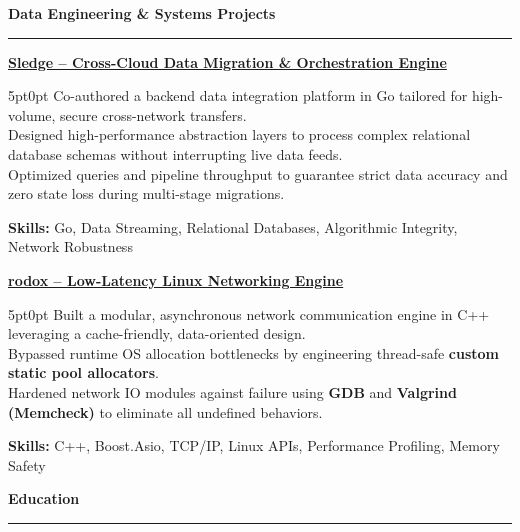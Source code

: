 \documentclass[9pt]{extarticle}
\begin{document}
\par\vspace{5pt}

{\large\bfseries Data Engineering \& Systems Projects}
\par\vspace{-8pt}
\rule{\linewidth}{0.4pt}
\par\vspace{5pt}

\underline{\bfseries Sledge -- Cross-Cloud Data Migration \& Orchestration Engine}
\par
\begin{adjustwidth}{5pt}{0pt}
    Co-authored a backend data integration platform in Go tailored for high-volume, secure cross-network transfers. \\
    Designed high-performance abstraction layers to process complex relational database schemas without interrupting live data feeds. \\
    Optimized queries and pipeline throughput to guarantee strict data accuracy and zero state loss during multi-stage migrations.
\end{adjustwidth}
\par
{\bfseries Skills:} Go, Data Streaming, Relational Databases, Algorithmic Integrity, Network Robustness

\par\vspace{8pt}

\underline{\bfseries rodox -- Low-Latency Linux Networking Engine}
\par
\begin{adjustwidth}{5pt}{0pt}
    Built a modular, asynchronous network communication engine in C++ leveraging a cache-friendly, data-oriented design. \\
    Bypassed runtime OS allocation bottlenecks by engineering thread-safe {\bfseries custom static pool allocators}. \\
    Hardened network IO modules against failure using {\bfseries GDB} and {\bfseries Valgrind (Memcheck)} to eliminate all undefined behaviors.
\end{adjustwidth}
\par
{\bfseries Skills:} C++, Boost.Asio, TCP/IP, Linux APIs, Performance Profiling, Memory Safety

\par\vspace{5pt}

{\large\bfseries Education}
\par\vspace{-8pt}
\rule{\linewidth}{0.4pt}
\par\vspace{5pt}
\end{document}
